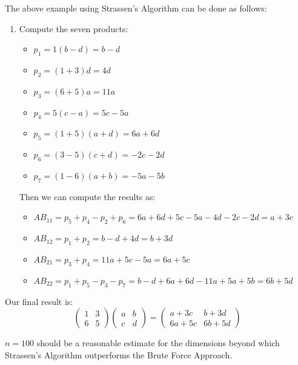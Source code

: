 \documentclass[addpoints]{exam}
\begin{document}
\begin{questions}
\begin{solution}
    The above example using Strassen's Algorithm can be done as follows:
    \begin{enumerate}
      \item Compute the seven products: \begin{itemize}
              \item $ p_1 = 1(b - d) = b - d $
              \item $ p_2 = (1 + 3)d = 4d $
              \item $ p_3 = (6 + 5)a = 11a $
              \item $ p_4 = 5(c - a) = 5c - 5a $
              \item $ p_5 = (1 + 5)(a + d) = 6a + 6d $
              \item $ p_6 = (3 - 5)(c + d) = -2c -2d $
              \item $ p_7 = (1 - 6)(a + b) = -5a -5b $
            \end{itemize}
            Then we can compute the results as: \begin{itemize}
              \item $ AB_{11} = p_5 + p_4 - p_2 + p_6 = 6a + 6d + 5c - 5a -4d -2c -2d = a + 3c $
              \item $ AB_{12} = p_1 + p_2 = b - d + 4d = b + 3d $
              \item $ AB_{21} = p_3 + p_4 = 11a + 5c - 5a = 6a + 5c $
              \item $ AB_{22} = p_1 + p_5 - p_3 - p_7 = b - d + 6a + 6d - 11a + 5a + 5b = 6b + 5d $
            \end{itemize}
    \end{enumerate}
    Our final result is: \[
      \begin{pmatrix}
        1 & 3 \\
        6 & 5
      \end{pmatrix}
      \begin{pmatrix}
        a & b \\
        c & d
      \end{pmatrix} = \begin{pmatrix}
        a + 3c  & b + 3d  \\
        6a + 5c & 6b + 5d
      \end{pmatrix}
    \]

    $ n = 100 $ should be a reasonable estimate for the dimensions beyond which Strassen's Algorithm outperforms the Brute Force Approach.
  \end{solution}

\end{questions}
\end{document}
